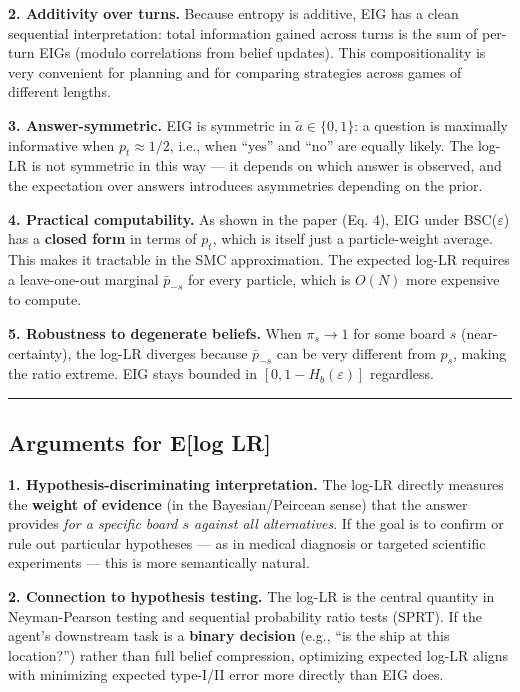 \documentclass[
]{article}
\begin{document}
\textbf{2. Additivity over turns.} Because entropy is additive, EIG has
a clean sequential interpretation: total information gained across turns
is the sum of per-turn EIGs (modulo correlations from belief updates).
This compositionality is very convenient for planning and for comparing
strategies across games of different lengths.

\textbf{3. Answer-symmetric.} EIG is symmetric in
\(\tilde{a} \in \{0, 1\}\): a question is maximally informative when
\(p_t \approx 1/2\), i.e., when ``yes'' and ``no'' are equally likely.
The log-LR is not symmetric in this way --- it depends on which answer
is observed, and the expectation over answers introduces asymmetries
depending on the prior.

\textbf{4. Practical computability.} As shown in the paper (Eq. 4), EIG
under BSC(\(\varepsilon\)) has a \textbf{closed form} in terms of
\(p_t\), which is itself just a particle-weight average. This makes it
tractable in the SMC approximation. The expected log-LR requires a
leave-one-out marginal \(\bar{p}_{-s}\) for every particle, which is
\(O(N)\) more expensive to compute.

\textbf{5. Robustness to degenerate beliefs.} When \(\pi_s \to 1\) for
some board \(s\) (near-certainty), the log-LR diverges because
\(\bar{p}_{-s}\) can be very different from \(p_s\), making the ratio
extreme. EIG stays bounded in \([0, 1-H_b(\varepsilon)]\) regardless.

\begin{center}\rule{0.5\linewidth}{0.5pt}\end{center}

\subsection{Arguments for E{[}log LR{]}}\label{arguments-for-elog-lr}

\textbf{1. Hypothesis-discriminating interpretation.} The log-LR
directly measures the \textbf{weight of evidence} (in the
Bayesian/Peircean sense) that the answer provides \emph{for a specific
board \(s\) against all alternatives}. If the goal is to confirm or rule
out particular hypotheses --- as in medical diagnosis or targeted
scientific experiments --- this is more semantically natural.

\textbf{2. Connection to hypothesis testing.} The log-LR is the central
quantity in Neyman-Pearson testing and sequential probability ratio
tests (SPRT). If the agent's downstream task is a \textbf{binary
decision} (e.g., ``is the ship at this location?'') rather than full
belief compression, optimizing expected log-LR aligns with minimizing
expected type-I/II error more directly than EIG does.
\end{document}
